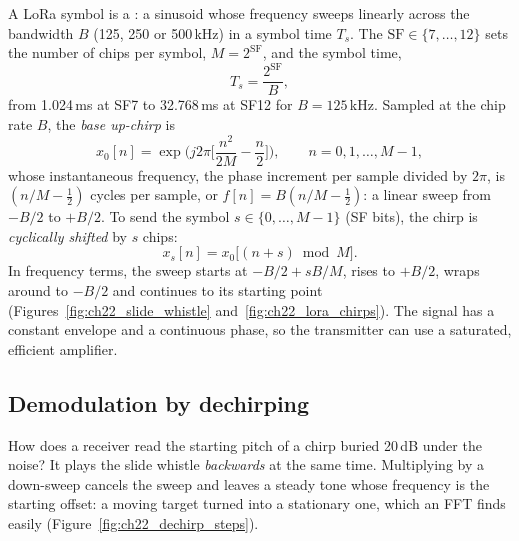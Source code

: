 A LoRa symbol is a : a sinusoid whose frequency sweeps linearly across the bandwidth $B$
(125, 250 or 500\,kHz) in a symbol time $T_s$. The  $\text{SF}\in\{7,\dots,12\}$
sets the number of chips per symbol, $M=2^{\text{SF}}$, and the symbol time,
\begin{equation}
T_s=\frac{2^{\text{SF}}}{B},
\label{eq:ch22:ts}
\end{equation}
from 1.024\,ms at SF7 to 32.768\,ms at SF12 for $B=125$\,kHz. Sampled at the chip rate $B$, the
\emph{base up-chirp} is
\begin{equation}
x_0[n]=\exp\!\Big(j2\pi\Big[\frac{n^2}{2M}-\frac n2\Big]\Big),\qquad n=0,1,\dots,M-1,
\label{eq:ch22:chirp}
\end{equation}
whose instantaneous frequency, the phase increment per sample divided by $2\pi$, is
$(n/M-\tfrac12)$ cycles per sample, or $f[n]=B(n/M-\tfrac12)$: a linear sweep from $-B/2$ to $+B/2$.
To send the symbol $s\in\{0,\dots,M-1\}$ (SF bits), the chirp is \emph{cyclically shifted} by $s$
chips:
\begin{equation}
x_s[n]=x_0\big[(n+s)\bmod M\big].
\label{eq:ch22:chirps}
\end{equation}
In frequency terms, the sweep starts at $-B/2+sB/M$, rises to $+B/2$, wraps around to $-B/2$ and
continues to its starting point (Figures~\ref{fig:ch22_slide_whistle} and~\ref{fig:ch22_lora_chirps}).
The signal has a constant envelope and a continuous phase, so the transmitter can use a saturated,
efficient amplifier.

\subsection{Demodulation by dechirping}

How does a receiver read the starting pitch of a chirp buried 20\,dB under the noise? It plays the
slide whistle \emph{backwards} at the same time. Multiplying by a down-sweep cancels the sweep and
leaves a steady tone whose frequency is the starting offset: a moving target turned into a
stationary one, which an FFT finds easily (Figure~\ref{fig:ch22_dechirp_steps}).


